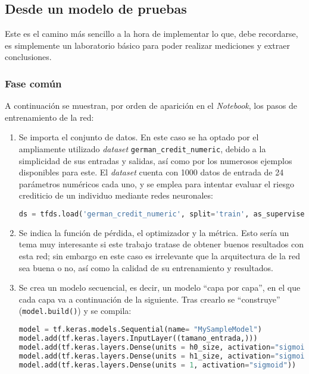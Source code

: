 \subsection{Desde un modelo de pruebas}
\label{ssec:desde_modelo_de_pruebas}
Este es el camino más sencillo a la hora de implementar lo que, debe recordarse, es simplemente un laboratorio básico para poder realizar mediciones y extraer conclusiones.

\subsubsection{Fase común}
\label{sssec:modelo_pruebas_fase_comun}
A continuación se muestran, por orden de aparición en el \textit{Notebook}, los pasos de entrenamiento de la red:

\begin{enumerate}
    \item Se importa el conjunto de datos. En este caso se ha optado por el ampliamente utilizado \textit{dataset} \texttt{german\_credit\_numeric}, debido a la simplicidad de sus entradas y salidas, así como por los numerosos ejemplos disponibles para este. El \textit{dataset} cuenta con 1000 datos de entrada de 24 parámetros numéricos cada uno, y se emplea para intentar evaluar el riesgo crediticio de un individuo mediante redes neuronales:\medskip
\begin{lstlisting}[language=Python]
ds = tfds.load('german_credit_numeric', split='train', as_supervised=True)
\end{lstlisting}

    \item Se indica la función de pérdida, el optimizador y la métrica. Esto sería un tema muy interesante si este trabajo tratase de obtener buenos resultados con esta red; sin embargo en este caso es irrelevante que la arquitectura de la red sea buena o no, así como la calidad de su entrenamiento y resultados.

    \item Se crea un modelo secuencial, es decir, un modelo ``capa por capa'', en el que cada capa va a continuación de la siguiente. Tras crearlo se ``construye'' (\texttt{model.build()}) y se compila:\medskip
\begin{lstlisting}[language=Python]
model = tf.keras.models.Sequential(name= "MySampleModel")
model.add(tf.keras.layers.InputLayer((tamano_entrada,)))
model.add(tf.keras.layers.Dense(units = h0_size, activation="sigmoid"))
model.add(tf.keras.layers.Dense(units = h1_size, activation="sigmoid"))
model.add(tf.keras.layers.Dense(units = 1, activation="sigmoid"))


\end{lstlisting}
\end{enumerate}
